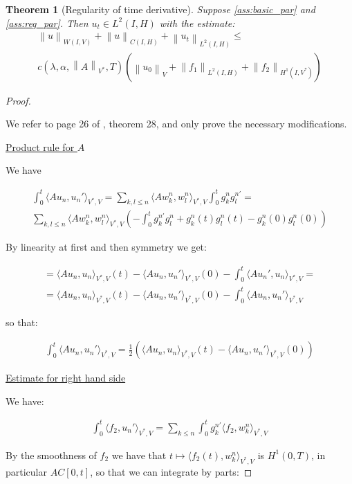 \documentclass[english,a4paper,12pt,oneside]{scrbook}
\theoremstyle{break}
\newtheorem{thm}[equation]{Theorem}
\newenvironment{mproof}[1][\proofname]{%
  \begin{proof}[#1]$ $\par\nobreak\ignorespaces
}{%
  \end{proof}
}
\renewcommand*{\proofname}{Proof}
\theoremstyle{remark}
\newcommand{\norm}[1]{\left\lVert#1\right\rVert}
\newcommand{\VN}[1]{\norm{#1}_{V}}
\newcommand{\VSN}[1]{\norm{#1}_{V^*}}
\begin{document}
\begin{thm}[Regularity of time derivative]
\label{thm:reg_time}
Suppose \cref{ass:basic_par} and \cref{ass:reg_par}. Then $u_t \in L^2(I, H)$ with the estimate:
\begin{align}
	\norm{u}_{W(I,V)} + \norm{u}_{C(I,H)} + \norm{u_t}_{L^2(I,H)} \leq\\ c(\lambda, \alpha, \VSN{A}, T)(\VN{u_0}+\norm{f_1}_{L^2(I,H)} + \norm{f_2}_{H^1(I,V^*)})
\end{align}
\end{thm}
\begin{mproof}
We refer to page 26 of \cite{gilardi}, theorem 28, and only prove the necessary modifications.

\underline{Product rule for $A$}

We have 

\begin{align*}
\int_0^t \langle Au_n,u_n' \rangle_{V^*,V} = \sum_{k,l\leq n} \langle Aw^n_k,w^n_l \rangle_{V^*,V} \int_0^t g_k^n g_l^{n '} = \\
\sum_{k,l\leq n} \langle Aw^n_k,w^n_l \rangle_{V^*,V} \left (-\int_0^t g_k^{n'} g_l^n + g_k^n(t) g_l^n(t)-g_k^n(0) g_l^n(0) \right )
\end{align*}

By linearity at first and then symmetry we get:

\begin{align*}
	= \langle Au_n,u_n \rangle_{V^*,V}(t)-\langle Au_n,u_n' \rangle_{V^*,V}(0)-\int_0^t\langle Au_n',u_n \rangle_{V^*,V}=\\
	= \langle Au_n,u_n \rangle_{V^*,V}(t)-\langle Au_n,u_n' \rangle_{V^*,V}(0)-\int_0^t\langle Au_n,u_n' \rangle_{V^*,V}
\end{align*}

so that:

\begin{align*}
	\int_0^t \langle Au_n,u_n' \rangle_{V^*,V} = \frac{1}{2}\left( \langle Au_n,u_n \rangle_{V^*,V}(t)-\langle Au_n,u_n' \rangle_{V^*,V}(0) \right )
\end{align*}

\underline{Estimate for right hand side}

We have:

\begin{align*}
	\int_0^t \langle f_2,u_n' \rangle_{V^*,V} = \sum_{k\leq n}\int_0^tg_k^{n'}\langle f_2,w_k^n \rangle_{V^*,V}
\end{align*}

By the smoothness of $f_2$ we have that $t \mapsto \langle f_2(t),w_k^n \rangle_{V^*,V}$ is $H^1(0,T)$, in particular $AC[0,t]$, so that we can integrate by parts:


\end{mproof}
\end{document}
